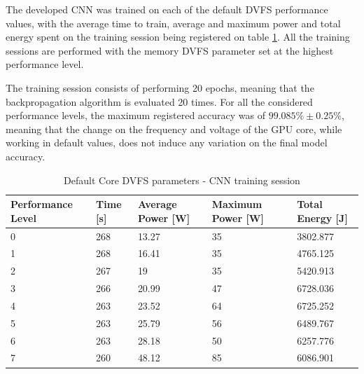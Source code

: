 The developed CNN was trained on each of the default DVFS performance values, with the average time to train, average and maximum power and total energy spent on the training session being registered on table \ref{tab:defaultDVFStrain}. All the training sessions are performed with the memory DVFS parameter set at the highest performance level.

The training session consists of performing 20 epochs, meaning that the backpropagation algorithm is evaluated 20 times. For all the considered performance levels, the maximum registered accuracy was of $99.085\% \pm 0.25\% $, meaning that the change on the frequency and voltage of the GPU core, while working in default values, does not induce any variation on the final model accuracy.

\begin{table}[!htb]
\centering
\begin{tabular}{lllll}
\textbf{Performance Level} & \textbf{Time {[}s{]}} & \textbf{Average Power {[}W{]}} & \textbf{Maximum Power {[}W{]}} & \textbf{Total Energy {[}J{]}} \\ \hline
0                          & 268                   & 13.27                          & 35                             & 3802.877                      \\
1                          & 268                   & 16.41                          & 35                             & 4765.125                      \\
2                          & 267                   & 19                             & 35                             & 5420.913                      \\
3                          & 266                   & 20.99                          & 47                             & 6728.036                      \\
4                          & 263                   & 23.52                          & 64                             & 6725.252                      \\
5                          & 263                    & 25.79                          & 56                             & 6489.767                      \\
6                          & 263                   & 28.18                          & 50                             & 6257.776                      \\
7                          & 260                   & 48.12                          & 85                             & 6086.901                     
\end{tabular}
\caption{Default Core DVFS parameters - CNN training session}
\label{tab:defaultDVFStrain}
\end{table}

